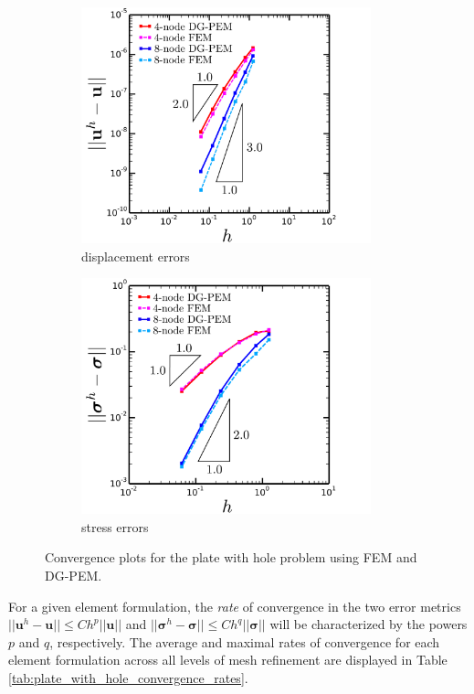\begin{figure}[!h]
  \centering
    \begin{subfigure}[b]{0.49\linewidth}
            \centering
            \includegraphics[width=3.3in]{figures/plate_with_hole_l2_errors.pdf}
    			\caption{displacement errors \label{fig:plate_with_hole_l2_errors}}
    \end{subfigure}
	\begin{subfigure}[b]{0.49\linewidth}
            \centering
            \includegraphics[width=3.3in]{figures/plate_with_hole_h1_errors.pdf}
    			\caption{stress errors \label{fig:plate_with_hole_h1_errors}}
    \end{subfigure} \caption{Convergence plots for the plate with hole problem using FEM and DG-PEM.}
  \label{fig:plate_with_hole_errors}
\end{figure}

For a given element formulation, the \textit{rate} of convergence in the two error metrics $|| \mathbf{u}^h - \mathbf{u} || \leq C h^p || \mathbf{u} ||$ and $|| \boldsymbol{\sigma}^h - \boldsymbol{\sigma} || \leq C h^q || \boldsymbol{\sigma} ||$ will be characterized by the powers $p$ and $q$, respectively. The average and maximal rates of convergence for each element formulation across all levels of mesh refinement are displayed in Table \ref{tab:plate_with_hole_convergence_rates}.

